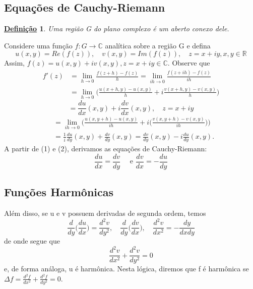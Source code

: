 \documentclass{article}
\newtheorem*{def*}{\underline{Defini\c c\~ao}}
\begin{document}
\subsection{Equa\c c\~oes de Cauchy-Riemann}
\begin{def*}
  Uma regi\~ao G do plano complexo \'e um aberto conexo dele.
\end{def*}
  Considere uma fun\c c\~ao $f:G\rightarrow \mathbb{C}$ anal\'itica sobre a regi\~ao G e defina
  $$
  u(x, y) = Re(f(z)), \quad v(x, y) = Im(f(z)), \quad z=x+iy, x, y\in \mathbb{R}
  $$
Assim, $f(z) = u(x, y) + iv(x, y), z=x+iy\in \mathbb{C}.$ Observe que 
  \begin{align*} 
    f'(z) &= \lim _{h\to{0}}\frac{f(z+h) - f(z)}{h} = \lim _{ih\to{0}}\frac{f(z+ih) - f(z)}{ih} \\
          &= \lim _{h\to{0}}\biggl(\frac{u(x+h, y) - u(x, y)}{h} + i\frac{v(x + h, y) - v(x, y)}{h}\biggr)
  \end{align*} 
 \begin{equation}
   = \frac{du}{dx}(x, y) + i \frac{dv}{dx}(x, y), \quad z = x + iy  
 \end{equation}
\begin{align}
   &= \lim _{ih\to{0}}\biggl(\frac{u(x, y+h) - u(x, y)}{ih} + i\biggl(\frac{v(x, y+h) - v(x, y)}{ih}\biggr)\biggr) \nonumber\\
   &= \frac{1}{i}\frac{du}{dy}(x, y) + \frac{dv}{dy}(x, y) = \frac{dv}{dy}(x, y) - i \frac{du}{dy}(x, y).
\end{align}
  A partir de (1) e (2), derivamos as equa\c c\~oes de Cauchy-Riemann:
  $$
  \boxed{\frac{du}{dx}=\frac{dv}{dy} \quad \text{ e } \frac{dv}{dx} = -\frac{du}{dy}}
  $$
\subsection{Fun\c c\~oes Harm\^onicas}
  Al\'em disso, se u e v possuem derivadas de segunda ordem, temos
  $$
  \frac{d}{dy}\biggl(\frac{du}{dx}\biggr) = \frac{d^2v}{dy^2}, \quad \frac{d}{dy}\biggl(\frac{dv}{dx}\biggr), \quad \frac{d^2v}{dx^2} = -\frac{dy}{dxdy}
  $$
de onde segue que 
  $$
  \frac{d^2v}{dx^2} + \frac{d^2v}{dy^2} = 0
  $$
e, de forma an\'aloga, u \'e harm\^onica. Nesta l\'ogica, diremos que f \'e harm\^onica
se $\Delta f = \frac{d^2f}{dx^2} + \frac{d^2f}{dy^2} = 0.$
  
\end{document}
